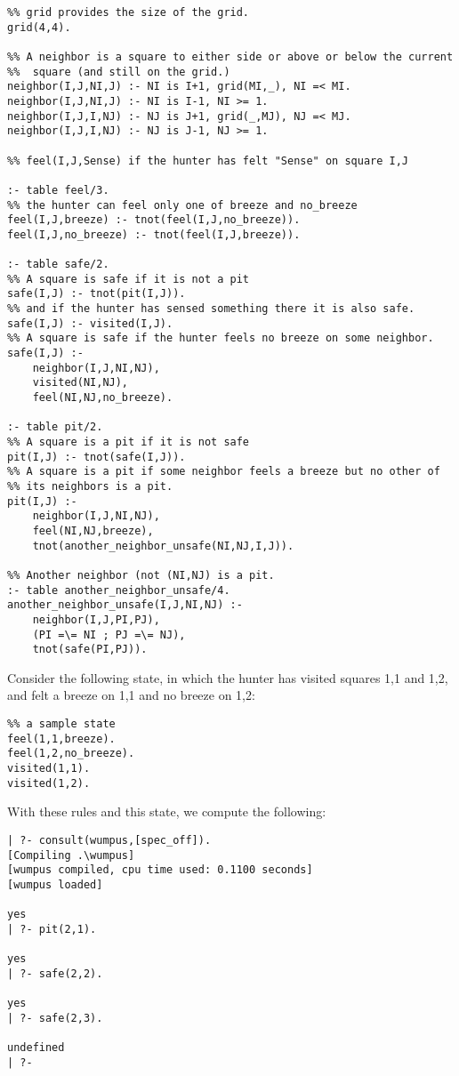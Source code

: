 \begin{verbatim}
%% grid provides the size of the grid.
grid(4,4).

%% A neighbor is a square to either side or above or below the current
%%  square (and still on the grid.)
neighbor(I,J,NI,J) :- NI is I+1, grid(MI,_), NI =< MI.
neighbor(I,J,NI,J) :- NI is I-1, NI >= 1.
neighbor(I,J,I,NJ) :- NJ is J+1, grid(_,MJ), NJ =< MJ.
neighbor(I,J,I,NJ) :- NJ is J-1, NJ >= 1.

%% feel(I,J,Sense) if the hunter has felt "Sense" on square I,J

:- table feel/3.
%% the hunter can feel only one of breeze and no_breeze
feel(I,J,breeze) :- tnot(feel(I,J,no_breeze)).
feel(I,J,no_breeze) :- tnot(feel(I,J,breeze)).

:- table safe/2.
%% A square is safe if it is not a pit
safe(I,J) :- tnot(pit(I,J)).
%% and if the hunter has sensed something there it is also safe.
safe(I,J) :- visited(I,J).
%% A square is safe if the hunter feels no breeze on some neighbor.
safe(I,J) :- 
	neighbor(I,J,NI,NJ),
	visited(NI,NJ),
	feel(NI,NJ,no_breeze).

:- table pit/2.
%% A square is a pit if it is not safe
pit(I,J) :- tnot(safe(I,J)).
%% A square is a pit if some neighbor feels a breeze but no other of
%% its neighbors is a pit.
pit(I,J) :-
	neighbor(I,J,NI,NJ),
	feel(NI,NJ,breeze),
	tnot(another_neighbor_unsafe(NI,NJ,I,J)).

%% Another neighbor (not (NI,NJ) is a pit.
:- table another_neighbor_unsafe/4.
another_neighbor_unsafe(I,J,NI,NJ) :-
	neighbor(I,J,PI,PJ),
	(PI =\= NI ; PJ =\= NJ),
	tnot(safe(PI,PJ)).
\end{verbatim}

Consider the following state, in which the hunter has visited squares
1,1 and 1,2, and felt a breeze on 1,1 and no breeze on 1,2:

\begin{verbatim}
%% a sample state
feel(1,1,breeze).
feel(1,2,no_breeze).
visited(1,1).
visited(1,2).
\end{verbatim}

With these rules and this state, we compute the following:

\begin{verbatim}
| ?- consult(wumpus,[spec_off]).
[Compiling .\wumpus]
[wumpus compiled, cpu time used: 0.1100 seconds]
[wumpus loaded]

yes
| ?- pit(2,1).

yes
| ?- safe(2,2).

yes
| ?- safe(2,3).

undefined
| ?- 
\end{verbatim}

